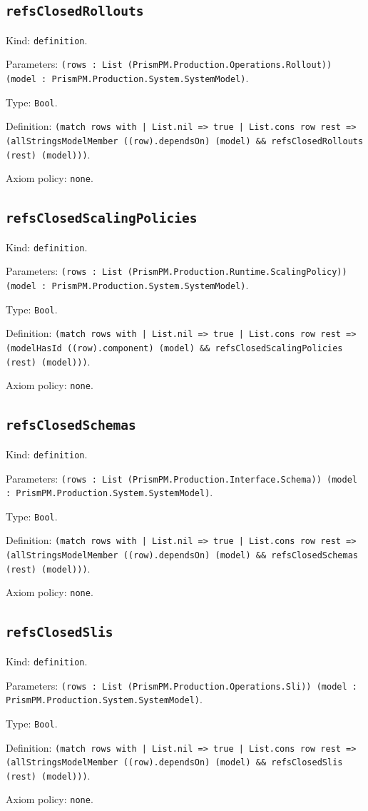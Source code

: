\documentclass[11pt]{article}
\begin{document}
\subsection*{\texttt{refsClosedRollouts}}
\noindent Kind: \texttt{definition}.\par
\noindent Parameters: \texttt{(rows : List (PrismPM.Production.Operations.Rollout)) (model : PrismPM.Production.System.SystemModel)}.\par
\noindent Type: \texttt{Bool}.\par
\noindent Definition: \texttt{(match rows with | List.nil => true | List.cons row rest => (allStringsModelMember ((row).dependsOn) (model) \&\& refsClosedRollouts (rest) (model)))}.\par
\noindent Axiom policy: \texttt{none}.\par
\subsection*{\texttt{refsClosedScalingPolicies}}
\noindent Kind: \texttt{definition}.\par
\noindent Parameters: \texttt{(rows : List (PrismPM.Production.Runtime.ScalingPolicy)) (model : PrismPM.Production.System.SystemModel)}.\par
\noindent Type: \texttt{Bool}.\par
\noindent Definition: \texttt{(match rows with | List.nil => true | List.cons row rest => (modelHasId ((row).component) (model) \&\& refsClosedScalingPolicies (rest) (model)))}.\par
\noindent Axiom policy: \texttt{none}.\par
\subsection*{\texttt{refsClosedSchemas}}
\noindent Kind: \texttt{definition}.\par
\noindent Parameters: \texttt{(rows : List (PrismPM.Production.Interface.Schema)) (model : PrismPM.Production.System.SystemModel)}.\par
\noindent Type: \texttt{Bool}.\par
\noindent Definition: \texttt{(match rows with | List.nil => true | List.cons row rest => (allStringsModelMember ((row).dependsOn) (model) \&\& refsClosedSchemas (rest) (model)))}.\par
\noindent Axiom policy: \texttt{none}.\par
\subsection*{\texttt{refsClosedSlis}}
\noindent Kind: \texttt{definition}.\par
\noindent Parameters: \texttt{(rows : List (PrismPM.Production.Operations.Sli)) (model : PrismPM.Production.System.SystemModel)}.\par
\noindent Type: \texttt{Bool}.\par
\noindent Definition: \texttt{(match rows with | List.nil => true | List.cons row rest => (allStringsModelMember ((row).dependsOn) (model) \&\& refsClosedSlis (rest) (model)))}.\par
\noindent Axiom policy: \texttt{none}.\par
\end{document}
